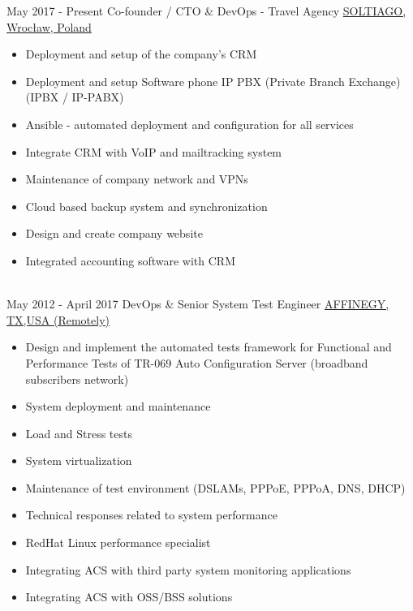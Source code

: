 \documentclass[letterpaper]{tenseconds} %
\begin{document}
\begin{twenty} %
	\twentyitem
        {May 2017 -}
        {Present}
        {Co-founder / CTO \& DevOps - Travel Agency}
        {\href{https://www.soltiago.com/}{SOLTIAGO, Wrocław, Poland}}
        {}
        {\begin{itemize}
        \item Deployment and setup of the company's CRM
        \item Deployment and setup Software phone IP PBX (Private Branch Exchange) (IPBX / IP-PABX)
        \item Ansible - automated deployment and configuration for all services
        \item Integrate CRM with VoIP and mailtracking system
        \item Maintenance of company network and VPNs
        \item Cloud based backup system and synchronization
        \item Design and create company website
        \item Integrated accounting software with CRM
        \end{itemize}}
        \\
	\twentyitem
        {May 2012 -}
        {April 2017}
        {DevOps \& Senior System Test Engineer}
        {\href{https://www.affinegy.com/}{AFFINEGY, TX,USA (Remotely)}}
        {}
        {\begin{itemize}
        \item Design and implement the automated tests framework for Functional and Performance Tests of TR-069 Auto Configuration Server (broadband subscribers network)
		\item System deployment and maintenance
        \item Load and Stress tests
        \item System virtualization
        \item Maintenance of test environment (DSLAMs, PPPoE, PPPoA, DNS, DHCP)
        \item Technical responses related to system performance
        \item RedHat Linux performance specialist
        \item Integrating ACS with third party system monitoring applications
        \item Integrating ACS with OSS/BSS solutions
        \end{itemize}}
        \\

\end{twenty}
\end{document}
